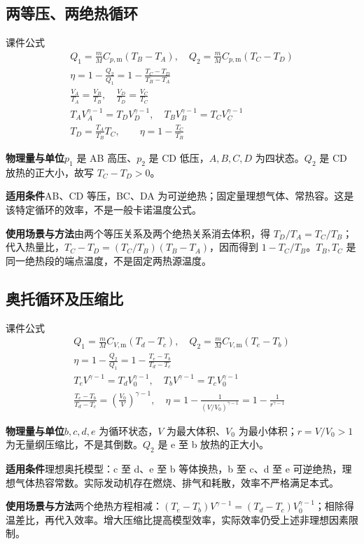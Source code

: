 \documentclass[UTF8,fontset=none,zihao=-4,a4paper]{ctexart}
\newcommand{\explain}[3]{\par\noindent\textbf{物理量与单位}\quad #1\par
\noindent\textbf{适用条件}\quad #2\par
\noindent\textbf{使用场景与方法}\quad #3\par}
\begin{document}
\par\noindent\begin{minipage}{\linewidth}
\subsection{两等压、两绝热循环}
\begin{infobox}[breakable=false]{课件公式}
\begin{gather*}Q_1=\frac mM C_{p,\mathrm m}(T_B-T_A),\quad Q_2=\frac mM C_{p,\mathrm m}(T_C-T_D)\\\eta=1-\frac{Q_2}{Q_1}=1-\frac{T_C-T_D}{T_B-T_A}\\\frac{V_A}{T_A}=\frac{V_B}{T_B},\quad\frac{V_D}{T_D}=\frac{V_C}{T_C}\\T_AV_A^{\gamma-1}=T_DV_D^{\gamma-1},\quad T_BV_B^{\gamma-1}=T_CV_C^{\gamma-1}\\T_D=\frac{T_A}{T_B}T_C,\qquad\eta=1-\frac{T_C}{T_B}\end{gather*}
\end{infobox}
\end{minipage}\par
\explain{$p_1$ 是 AB 高压、$p_2$ 是 CD 低压，$A,B,C,D$ 为四状态。$Q_2$ 是 CD 放热的正大小，故写 $T_C-T_D>0$。}{AB、CD 等压，BC、DA 为可逆绝热；固定量理想气体、常热容。这是该特定循环的效率，不是一般卡诺温度公式。}{由两个等压关系及两个绝热关系消去体积，得 $T_D/T_A=T_C/T_B$；代入热量比，$T_C-T_D=(T_C/T_B)(T_B-T_A)$，因而得到 $1-T_C/T_B$。$T_B,T_C$ 是同一绝热段的端点温度，不是固定两热源温度。}


\par\noindent\begin{minipage}{\linewidth}
\subsection{奥托循环及压缩比}
\begin{infobox}[breakable=false]{课件公式}
\begin{gather*}Q_1=\frac mM C_{V,\mathrm m}(T_d-T_c),\quad Q_2=\frac mM C_{V,\mathrm m}(T_e-T_b)\\\eta=1-\frac{Q_2}{Q_1}=1-\frac{T_e-T_b}{T_d-T_c}\\T_eV^{\gamma-1}=T_dV_0^{\gamma-1},\quad T_bV^{\gamma-1}=T_cV_0^{\gamma-1}\\\frac{T_e-T_b}{T_d-T_c}=\left(\frac{V_0}{V}\right)^{\gamma-1},\quad\eta=1-\frac1{(V/V_0)^{\gamma-1}}=1-\frac1{r^{\gamma-1}}\end{gather*}
\end{infobox}
\end{minipage}\par
\explain{$b,c,d,e$ 为循环状态，$V$ 为最大体积、$V_0$ 为最小体积；$r=V/V_0>1$ 为无量纲压缩比，不是其倒数。$Q_2$ 是 e 至 b 放热的正大小。}{理想奥托模型：c 至 d、e 至 b 等体换热，b 至 c、d 至 e 可逆绝热，理想气体热容常数。实际发动机存在燃烧、排气和耗散，效率不严格满足本式。}{两个绝热方程相减：$(T_e-T_b)V^{\gamma-1}=(T_d-T_c)V_0^{\gamma-1}$；相除得温差比，再代入效率。增大压缩比提高模型效率，实际效率仍受上述非理想因素限制。}
\end{document}
